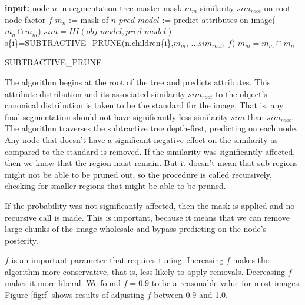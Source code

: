 \documentclass[10pt,twocolumn,letterpaper]{article}
\begin{document}
\begin{algorithm}
\begin{algorithmic}
  \STATE \textbf{input:} 
  \STATE \hspace{3 mm} node $n$ in segmentation tree
  \STATE \hspace{3 mm} master mask $m_m$
  \STATE \hspace{3 mm} similarity $sim_{root}$ on root node
  \STATE \hspace{3 mm} factor $f$
  \STATE $m_n$ := mask of $n$
  \STATE $pred\_model$ := predict attributes on image($m_n \cap m_m$)
  \STATE $sim=HI(obj\_model,pred\_model)$
      \STATE s\{i\}=SUBTRACTIVE\_PRUNE(n.children\{i\},$m_m$,
      \STATE ...$sim_{root}$, $f$)
    \ENDFOR
  \ELSE
    \STATE $m_m = m_m \cap m_n$
  \ENDIF
\end{algorithmic}
\caption{SUBTRACTIVE\_PRUNE}
\label{alg:sub_prune}
\end{algorithm}

The algorithm begins at the root of the tree and predicts attributes.
This attribute distribution and its associated similarity $sim_{root}$ 
to the object's canonical distribution is taken to be
the standard for the image.  That is, any final segmentation should not have
significantly less similarity $sim$ than $sim_{root}$.  The algorithm traverses
the subtractive tree depth-first, predicting on each node.  
Any node that doesn't have a significant negative effect on the similarity as 
compared to the standard is removed.  If the
similarity was significantly affected, then we know that the region
must remain.  But it doesn't mean that sub-regions might not be able to be pruned
out, so the procedure is called recursively, checking for smaller regions
that might be able to be pruned.

If the probability was not significantly affected, then the mask is applied
and no recursive call is made.  This is important, because it means
that we can remove large chunks of the image wholesale and bypass predicting
on the node's posterity.

$f$ is an important parameter that requires tuning.  Increasing $f$ makes the
algorithm more conservative, that is, less likely to apply removals.  Decreasing
$f$ makes it more liberal.  We found $f=0.9$ to be a reasonable value for most images.
Figure \ref{fig:f} shows results of adjusting $f$ between 0.9 and 1.0.
\end{document}
